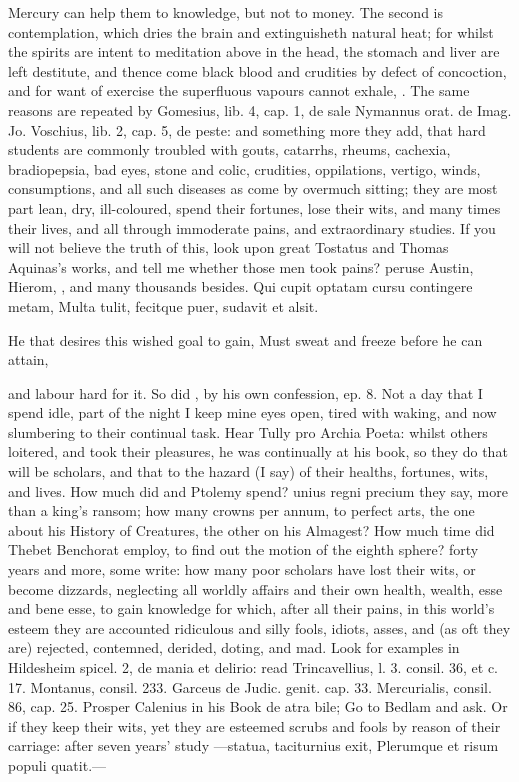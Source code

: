 {Mercury can help them to knowledge, but not to money. The second is
contemplation, which dries the brain and extinguisheth natural
heat; for whilst the spirits are intent to meditation above in the
head, the stomach and liver are left destitute, and thence come black
blood and crudities by defect of concoction, and for want of exercise
the superfluous vapours cannot exhale, \etc{}. The same reasons are
repeated by Gomesius, lib. 4, cap. 1, de sale Nymannus orat. de
Imag. Jo. Voschius, lib. 2, cap. 5, de peste: and something more they
add, that hard students are commonly troubled with gouts, catarrhs,
rheums, cachexia, bradiopepsia, bad eyes, stone and colic,
crudities, oppilations, vertigo, winds, consumptions, and all
such diseases as come by overmuch sitting; they are most part lean,
dry, ill-coloured, spend their fortunes, lose their wits, and many
times their lives, and all through immoderate pains, and extraordinary
studies. If you will not believe the truth of this, look upon great
Tostatus and Thomas Aquinas's works, and tell me whether those men took
pains? peruse Austin, Hierom, \etc{}, and many thousands besides.
Qui cupit optatam cursu contingere metam,
Multa tulit, fecitque puer, sudavit et alsit.

He that desires this wished goal to gain,
Must sweat and freeze before he can attain,

and labour hard for it. So did \Seneca, by his own confession, ep. 8.
Not a day that I spend idle, part of the night I keep mine eyes
open, tired with waking, and now slumbering to their continual task.
Hear Tully pro Archia Poeta: whilst others loitered, and took their
pleasures, he was continually at his book, so they do that will be
scholars, and that to the hazard (I say) of their healths, fortunes,
wits, and lives. How much did \Aristotle and Ptolemy spend? unius regni
precium they say, more than a king's ransom; how many crowns per annum,
to perfect arts, the one about his History of Creatures, the other on
his Almagest? How much time did Thebet Benchorat employ, to find out
the motion of the eighth sphere? forty years and more, some write: how
many poor scholars have lost their wits, or become dizzards, neglecting
all worldly affairs and their own health, wealth, esse and bene esse,
to gain knowledge for which, after all their pains, in this world's
esteem they are accounted ridiculous and silly fools, idiots, asses,
and (as oft they are) rejected, contemned, derided, doting, and mad.
Look for examples in Hildesheim spicel. 2, de mania et delirio: read
Trincavellius, l. 3. consil. 36, et c. 17. Montanus, consil. 233.
Garceus de Judic. genit. cap. 33. Mercurialis, consil. 86, cap.
25. Prosper Calenius in his Book de atra bile; Go to Bedlam and
ask. Or if they keep their wits, yet they are esteemed scrubs and fools
by reason of their carriage: after seven years' study
---statua, taciturnius exit,
Plerumque et risum populi quatit.---

}
